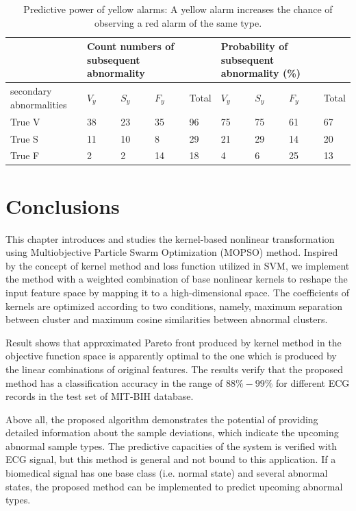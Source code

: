 \begin{table}
	\caption{Predictive power of yellow alarms: A yellow alarm increases the chance of observing a red alarm of the same type.}
	\centering
	\begin{tabular}{|m{6em}| m{2em}| m{2em}| m{2em} |m{2em}| m{2em}| m{2em}| m{2em}| m{2em}|}
		\hline
		& \multicolumn{3}{p{6em}}{Count numbers of subsequent abnormality}& &\multicolumn{3}{p{6em}}{Probability of subsequent abnormality (\%)}  & \\ 
		\hline 
		secondary abnormalities & $V_y$ & $S_y$ & $F_y$ & Total & $V_y$ & $S_y$ & $F_y$ & Total \\ 
		\hline 
		True V & 38 & 23 & 35& 96 & 75 & 75 & 61 & 67 \\ 
		\hline 
		True S & 11 & 10 & 8 & 29 & 21 & 29 & 14& 20 \\ 
		\hline 
		True F & 2 & 2 & 14 & 18 & 4 & 6 & 25 & 13 \\ 
		\hline 
	\end{tabular}%
	\label{table:pred}
\end{table}


\section{Conclusions}

This chapter introduces and studies the kernel-based nonlinear transformation using Multiobjective Particle Swarm Optimization (MOPSO) method. Inspired by the concept of kernel method and loss function utilized in SVM, we implement the method with a weighted combination of base nonlinear kernels to reshape the input feature space by mapping it to a high-dimensional space. The coefficients of kernels are optimized according to two conditions, namely, maximum separation between cluster and maximum cosine similarities between abnormal clusters.

Result shows that approximated Pareto front produced by kernel method in the objective function space is apparently optimal to the one which is produced by the linear combinations of original features. The results verify that the proposed method has a classification accuracy in the range of $88\%-99\%$ for different ECG records in the test set of MIT-BIH database.

Above all, the proposed algorithm demonstrates the potential of providing detailed information about the sample deviations, which indicate the upcoming abnormal sample types. The predictive capacities of the system is verified with ECG signal, but this method is general and not bound to this application. If a biomedical signal has one base class (i.e. normal state) and several abnormal states, the proposed method can be implemented to predict upcoming abnormal types.
  
